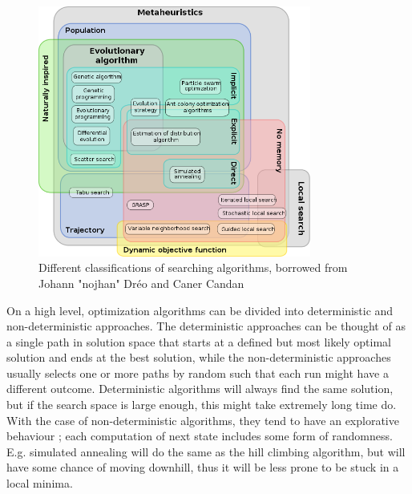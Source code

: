 \begin{figure}
    \centering
    \includegraphics[width=0.8\textwidth]{figs/630px-Metaheuristics_classification.png}
    \caption{Different classifications of searching algorithms, borrowed from Johann "nojhan" Dréo and Caner Candan \cite{wikimetaheuristics}}
    \label{fig:metaheuristics}
\end{figure}

On a high level, optimization algorithms can be divided into deterministic and
non-deterministic approaches. The deterministic approaches can be thought of as
a single path in solution space that starts at a defined but most likely optimal
solution and ends at the best solution, while the non-deterministic approaches
usually selects one or more paths by random such that each run might have a
different outcome. Deterministic algorithms will always find the same solution,
but if the search space is large enough, this might take extremely long time do.
With the case of non-deterministic algorithms, they tend to have an
explorative behaviour \cite{poli2008field}; each computation of next state
includes some form of randomness. E.g. simulated annealing will do the same as
the hill climbing algorithm, but will have some chance of moving downhill, thus
it will be less prone to be stuck in a local minima.


